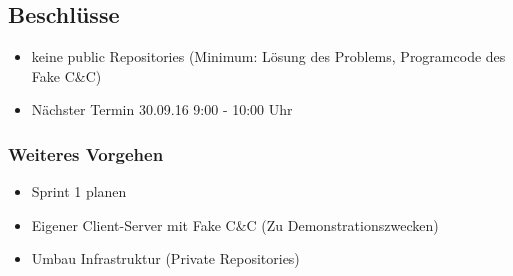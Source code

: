 \documentclass[class=scrbook,crop=false]{standalone}
\begin{document}
	\subsection*{Beschlüsse}
	\begin{itemize}
    	\item keine public Repositories (Minimum: Lösung des Problems, Programcode des Fake C\&C)
    	\item Nächster Termin 30.09.16 9:00 - 10:00 Uhr
    	
	\end{itemize}

	\subsubsection*{Weiteres Vorgehen}
	\begin{itemize}
    	  \item Sprint 1 planen
    	  \item Eigener Client-Server mit Fake C\&C (Zu Demonstrationszwecken)
    	  \item Umbau Infrastruktur (Private Repositories)
	\end{itemize}
\end{document}
